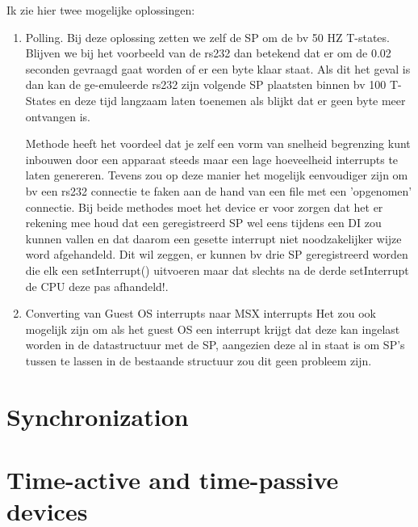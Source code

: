 \documentclass[11pt, a4paper]{report}
\begin{document}
Ik zie hier twee mogelijke oplossingen:
\label{unpredic-irq}
\begin{enumerate}
\item Polling.
Bij deze oplossing zetten we zelf de SP om de bv 50 HZ T-states.
Blijven we bij het voorbeeld van de rs232 dan betekend dat er om de 0.02 seconden 
gevraagd gaat worden of er een byte klaar staat. Als dit het geval is dan kan de 
ge-emuleerde rs232 zijn volgende SP plaatsten binnen bv 100 T-States en deze tijd 
langzaam laten toenemen als blijkt dat er geen byte meer ontvangen is.

Methode heeft het voordeel dat je zelf een vorm van snelheid begrenzing kunt
inbouwen door een apparaat steeds maar een lage hoeveelheid interrupts te laten
genereren. Tevens zou op deze manier het mogelijk eenvoudiger zijn om bv een
rs232 connectie te faken aan de hand van een file met een 'opgenomen' connectie.
Bij beide methodes moet het device er voor zorgen dat het er rekening mee houd
dat een geregistreerd SP wel eens tijdens een DI zou kunnen vallen en dat daarom
een gesette interrupt niet noodzakelijker wijze word afgehandeld. Dit wil
zeggen, er kunnen bv drie SP geregistreerd worden die elk een setInterrupt()
uitvoeren maar dat slechts na de derde setInterrupt de CPU deze pas afhandeld!.

\item Converting van Guest OS interrupts naar MSX interrupts
Het zou ook mogelijk zijn om als het guest OS een interrupt krijgt dat deze kan 
ingelast worden in de datastructuur met de SP, aangezien deze al in staat is om 
SP's tussen te lassen in de bestaande structuur zou dit geen probleem zijn.
\end{enumerate}




\section{Synchronization}

\section{Time-active and time-passive devices}
\end{document}
